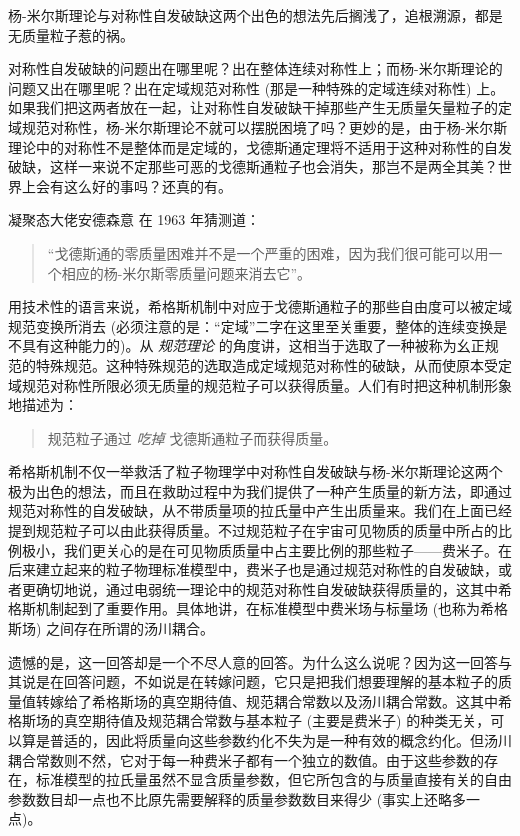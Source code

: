 杨-米尔斯理论与对称性自发破缺这两个出色的想法先后搁浅了，追根溯源，都是无质量粒子惹的祸。

对称性自发破缺的问题出在哪里呢？出在整体连续对称性上；而杨-米尔斯理论的问题又出在哪里呢？出在定域规范对称性 (那是一种特殊的定域连续对称性) 上。如果我们把这两者放在一起，让对称性自发破缺干掉那些产生无质量矢量粒子的定域规范对称性，杨-米尔斯理论不就可以摆脱困境了吗？更妙的是，由于杨-米尔斯理论中的对称性不是整体而是定域的，戈德斯通定理将不适用于这种对称性的自发破缺，这样一来说不定那些可恶的戈德斯通粒子也会消失，那岂不是两全其美？世界上会有这么好的事吗？还真的有。


凝聚态大佬安德森意 在 1963 年猜测道：

\begin{quote}
    “戈德斯通的零质量困难并不是一个严重的困难，因为我们很可能可以用一个相应的杨-米尔斯零质量问题来消去它”。
\end{quote}

用技术性的语言来说，希格斯机制中对应于戈德斯通粒子的那些自由度可以被定域规范变换所消去 (必须注意的是：“定域”二字在这里至关重要，整体的连续变换是不具有这种能力的)。从 \emph{规范理论} 的角度讲，这相当于选取了一种被称为幺正规范的特殊规范。这种特殊规范的选取造成定域规范对称性的破缺，从而使原本受定域规范对称性所限必须无质量的规范粒子可以获得质量。人们有时把这种机制形象地描述为：

\begin{quote}
    规范粒子通过 \emph{吃掉} 戈德斯通粒子而获得质量。
\end{quote}

希格斯机制不仅一举救活了粒子物理学中对称性自发破缺与杨-米尔斯理论这两个极为出色的想法，而且在救助过程中为我们提供了一种产生质量的新方法，即通过规范对称性的自发破缺，从不带质量项的拉氏量中产生出质量来。我们在上面已经提到规范粒子可以由此获得质量。不过规范粒子在宇宙可见物质的质量中所占的比例极小，我们更关心的是在可见物质质量中占主要比例的那些粒子——费米子。在后来建立起来的粒子物理标准模型中，费米子也是通过规范对称性的自发破缺，或者更确切地说，通过电弱统一理论中的规范对称性自发破缺获得质量的，这其中希格斯机制起到了重要作用。具体地讲，在标准模型中费米场与标量场 (也称为希格斯场) 之间存在所谓的汤川耦合。

遗憾的是，这一回答却是一个不尽人意的回答。为什么这么说呢？因为这一回答与其说是在回答问题，不如说是在转嫁问题，它只是把我们想要理解的基本粒子的质量值转嫁给了希格斯场的真空期待值、规范耦合常数以及汤川耦合常数。这其中希格斯场的真空期待值及规范耦合常数与基本粒子 (主要是费米子) 的种类无关，可以算是普适的，因此将质量向这些参数约化不失为是一种有效的概念约化。但汤川耦合常数则不然，它对于每一种费米子都有一个独立的数值。由于这些参数的存在，标准模型的拉氏量虽然不显含质量参数，但它所包含的与质量直接有关的自由参数数目却一点也不比原先需要解释的质量参数数目来得少 (事实上还略多一点)。

